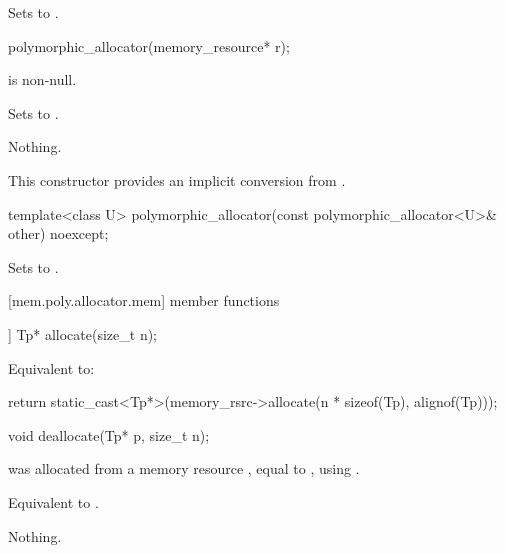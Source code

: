 \begin{itemdescr}
\pnum
\effects
Sets  to .
\end{itemdescr}

%
\begin{itemdecl}
polymorphic_allocator(memory_resource* r);
\end{itemdecl}

\begin{itemdescr}
\pnum
\requires
{} is non-null.

\pnum
\effects
Sets  to .

\pnum
\throws
Nothing.

\pnum
\begin{note}
This constructor provides an implicit conversion from .
\end{note}
\end{itemdescr}

%
\begin{itemdecl}
template<class U>
  polymorphic_allocator(const polymorphic_allocator<U>& other) noexcept;
\end{itemdecl}

\begin{itemdescr}
\pnum
\effects
Sets  to .
\end{itemdescr}


[mem.poly.allocator.mem]{ member functions}

%
\begin{itemdecl}
[[nodiscard]] Tp* allocate(size_t n);
\end{itemdecl}

\begin{itemdescr}
\pnum
\effects
Equivalent to:
\begin{codeblock}
return static_cast<Tp*>(memory_rsrc->allocate(n * sizeof(Tp), alignof(Tp)));
\end{codeblock}
\end{itemdescr}

%
\begin{itemdecl}
void deallocate(Tp* p, size_t n);
\end{itemdecl}

\begin{itemdescr}
\pnum
\requires
{} was allocated from a memory resource ,
equal to ,
using .

\pnum
\effects
Equivalent to .

\pnum
\throws
Nothing.
\end{itemdescr}

